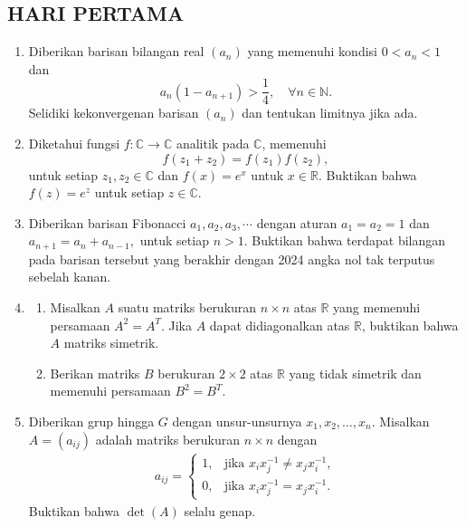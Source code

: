\documentclass[12pt,twoside]{article}
\begin{document}
\subsection{HARI PERTAMA}
\begin{enumerate}
    \item Diberikan barisan bilangan real $(a_n)$ yang memenuhi kondisi $0<a_n<1$ dan $$
              a_n(1-a_{n+1})>\frac{1}{4}, \quad \forall n\in\mathbb{N}.$$
          Selidiki kekonvergenan barisan $(a_n)$ dan tentukan limitnya jika ada.
    \item Diketahui fungsi $f:\mathbb{C}\to\mathbb{C}$ analitik pada $\mathbb{C}$, memenuhi
          $$
              f(z_1+z_2)=f(z_1)f(z_2),
          $$
          untuk setiap $z_1,z_2\in \mathbb{C}$ dan $f(x)=e^x$ untuk $x\in \mathbb{R}$. Buktikan bahwa $f(z)=e^z$ untuk setiap $z\in\mathbb{C}$.
    \item Diberikan barisan Fibonacci $a_1,a_2,a_3,\cdots$ dengan aturan $a_1=a_2=1$ dan $a_{n+1}=a_n+a_{n-1},$ untuk setiap $n>1$.
          Buktikan bahwa terdapat bilangan pada barisan tersebut yang berakhir dengan 2024 angka nol tak terputus sebelah kanan.
    \item
          \begin{enumerate}
              \item Misalkan $A$ suatu matriks berukuran $n\times n$ atas $\mathbb{R}$ yang memenuhi persamaan $A^2=A^T$. Jika $A$ dapat didiagonalkan atas $\mathbb{R}$, buktikan bahwa $A$ matriks simetrik.
              \item Berikan matriks $B$ berukuran $2\times 2$ atas $\mathbb{R}$ yang tidak simetrik dan memenuhi persamaan $B^2=B^T$.
          \end{enumerate}
    \item Diberikan grup hingga $G$ dengan unsur-unsurnya $x_1,x_2,\dots,x_n$. Misalkan $A=(a_{ij})$ adalah matriks berukuran $n\times n$ dengan
          \begin{align*}
              a_{ij}=\begin{cases}
                         1, & \text{jika } x_ix_j^{-1} \neq x_jx_i^{-1}, \\
                         0, & \text{jika } x_ix_j^{-1} = x_jx_i^{-1}.
                     \end{cases}
          \end{align*}
          Buktikan bahwa $\det(A)$ selalu genap.
\end{enumerate}
\pagebreak
\end{document}
